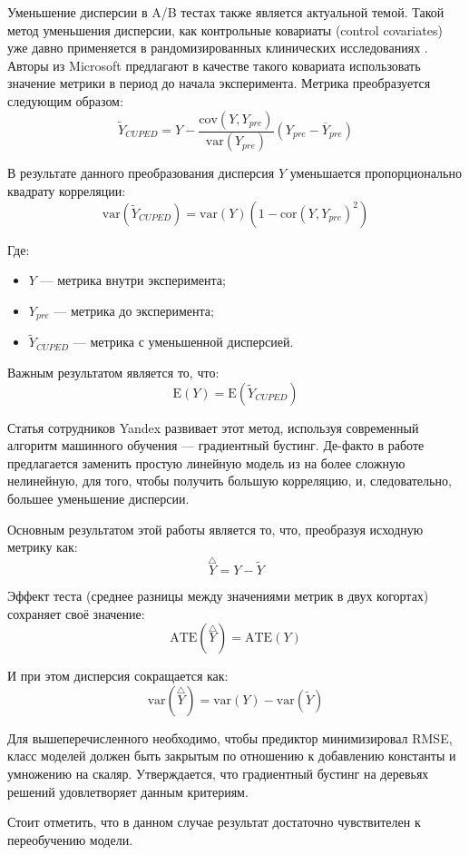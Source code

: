 \documentclass[../document.tex]{subfiles}
\begin{document}
	\par Уменьшение дисперсии в A/B тестах также является актуальной темой. Такой метод уменьшения дисперсии, как контрольные ковариаты (control covariates) уже давно применяется в рандомизированных клинических исследованиях \cite{cuped}. Авторы из Microsoft предлагают в качестве такого ковариата использовать значение метрики в период до начала эксперимента. Метрика преобразуется следующим образом:
	\begin{equation}
		\tilde{Y}_{CUPED}=Y-\frac{\text{cov}(Y,Y_{pre})}{\text{var}(Y_{pre})}(Y_{pre}-\overline{Y}_{pre})
	\end{equation}
	\par В результате данного преобразования дисперсия $Y$ уменьшается пропорционально квадрату корреляции:
	\begin{equation}
		\text{var}(\tilde{Y}_{CUPED})=\text{var}(Y)\left(1-\text{cor}(Y,Y_{pre})^2\right)
	\end{equation}
	\par Где:
	\begin{itemize}
		\item $Y$ --- метрика внутри эксперимента;
		\item $Y_{pre}$ --- метрика до эксперимента;
		\item $\tilde{Y}_{CUPED}$ --- метрика с уменьшенной дисперсией.
	\end{itemize}
	\par Важным результатом является то, что:
	\begin{equation}
		\text{E}(Y)=\text{E}(\tilde{Y}_{CUPED})
	\end{equation}
	\par Статья \cite{boosting_ab} сотрудников Yandex развивает этот метод, используя современный алгоритм машинного обучения --- градиентный бустинг. Де-факто в работе предлагается заменить простую линейную модель из \cite{cuped} на более сложную нелинейную, для того, чтобы получить большую корреляцию, и, следовательно, большее уменьшение дисперсии.
	\par Основным результатом этой работы является то, что, преобразуя исходную метрику как:
	\begin{equation}
		\overset{\triangle}{Y}=Y-\tilde{Y}
	\end{equation}
	\par Эффект теста (среднее разницы между значениями метрик в двух когортах) сохраняет своё значение:
	\begin{equation}
		\text{ATE}(\overset{\triangle}{Y})=\text{ATE}(Y)
	\end{equation}
	\par И при этом дисперсия сокращается как:
	\begin{equation}
		\text{var}(\overset{\triangle}{Y})=\text{var}(Y)-\text{var}(\tilde{Y})
	\end{equation}
	\par Для вышеперечисленного необходимо, чтобы предиктор минимизировал RMSE, класс моделей должен быть закрытым по отношению к добавлению константы и умножению на скаляр. Утверждается, что градиентный бустинг на деревьях решений удовлетворяет данным критериям.
	\par Стоит отметить, что в данном случае результат достаточно чувствителен к переобучению модели.
\end{document}
